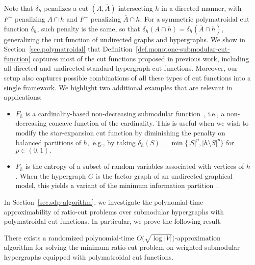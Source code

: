 \documentclass[letterpaper]{article}
\begin{document}
Note that $\delta_h$ penalizes a cut $(A,\overline{A})$ intersecting $h$ in a directed manner, with $F^{-}$ penalizing $A \cap h$ and $F^{+}$ penalizing $\overline{A} \cap h$.  For a symmetric polymatroidal cut function $\delta_h$, such penalty is the same, so that $\delta_h(A \cap h) = \delta_h(\overline{A} \cap h)$, generalizing the cut function of undirected graphs and hypergraphs.
We show in Section~\ref{sec.polymatroidal} that Definition~\ref{def.monotone-submodular-cut-function} captures most of the cut functions proposed in previous work, including all directed and undirected standard hypergraph cut functions. Moreover, our setup also captures possible combinations of all these types of cut functions into a single framework.
We highlight two additional examples that are relevant in applications:
\begin{itemize}
\item $F_h$ is a cardinality-based non-decreasing submodular function~\cite{veldt2021approximate}, i.e., a non-decreasing concave function of the cardinality. This is useful when we wish to modify the star-expansion cut function by diminishing the penalty on balanced partitions of $h,$ e.g., by taking $\delta_h(S) = \min\big\{ |S|^p,|h \setminus S|^p \big\}$ for $p \in (0,1).$
\item $F_h$ is the entropy of a subset of random variables associated with vertices of $h$. When the hypergraph $G$ is the factor graph of an undirected graphical model, this yields a variant of the minimum information partition~\cite{ hidakaFastExactSearch2018,narasimhanQClustering2005}.
\end{itemize}

In Section~\ref{sec.sdp-algorithm}, we investigate the polynomial-time approximability of ratio-cut problems over submodular hypergraphs with polymatroidal cut functions. In particular, we prove the following result.
\begin{theorem}\label{thm.main-metric-approx}
There exists a randomized polynomial-time $O\big( \sqrt{\log |V|} \big)$-approximation algorithm
for solving the minimum ratio-cut problem on weighted submodular hypergraphs equipped with polymatroidal cut functions.
\end{theorem}
\end{document}
